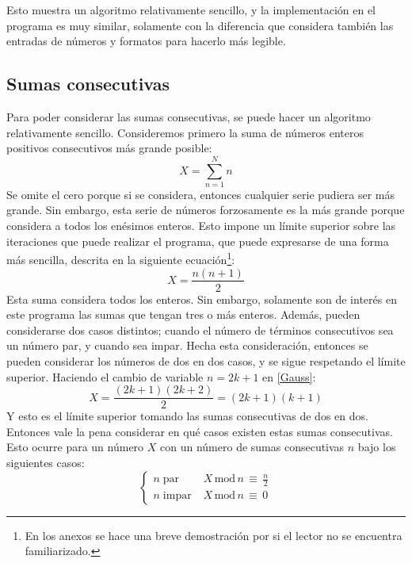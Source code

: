 \documentclass[conference]{IEEEtran}
\begin{document}
        Esto muestra un algoritmo relativamente sencillo, y la implementación en
        el programa es muy similar, solamente con la diferencia que considera también
        las entradas de números y formatos para hacerlo más legible. 
    \subsection{Sumas consecutivas}
        Para poder considerar las sumas consecutivas, se puede hacer un algoritmo
        relativamente sencillo. Consideremos primero la suma de números enteros
        positivos consecutivos más grande posible:
        \begin{equation*}
            X = \sum_{n=1}^N n
        \end{equation*}
        Se omite el cero porque si se considera, entonces cualquier serie pudiera
        ser más grande. Sin embargo, esta serie de números forzosamente es la más
        grande porque considera a todos los enésimos enteros. Esto impone un límite
        superior sobre las iteraciones que puede realizar el programa, que puede
        expresarse de una forma más sencilla, descrita en la siguiente ecuación\footnote{En los anexos se hace una breve demostración por si el lector no se encuentra familiarizado.}:
        \begin{equation}
            \label{Gauss}
            X = \frac{n(n+1)}{2}
        \end{equation}
        Esta suma considera todos los enteros. Sin embargo, solamente son de interés
        en este programa las sumas que tengan tres o más enteros. Además, pueden
        considerarse dos casos distintos; cuando el número de términos consecutivos
        sea un número par, y cuando sea impar. Hecha esta consideración, entonces
        se pueden considerar los números de dos en dos casos, y se sigue respetando el 
        límite superior. Haciendo el cambio de variable $n=2k+1$ en \eqref{Gauss}:
        \begin{equation}
            X = \frac{(2k+1)(2k+2)}{2}=(2k+1)(k+1)
        \end{equation}
        Y esto es el límite superior tomando las sumas consecutivas de dos en dos. 
        Entonces vale la pena considerar en qué casos existen estas sumas consecutivas. 
        Esto ocurre para un número $X$ con un número de sumas consecutivas $n$ bajo los siguientes casos:
        \begin{equation*}
            \begin{cases}
                n\; \mathrm{par} &\; X\, \mathrm{mod}\, n\, \equiv\, \frac{n}{2} \\
                n\; \mathrm{impar} &\; X\, \mathrm{mod}\, n\, \equiv\, 0
            \end{cases}
        \end{equation*}
\end{document}
